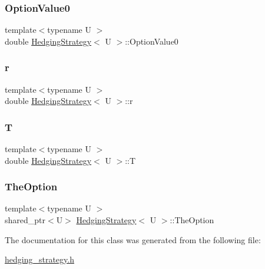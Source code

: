 \subsubsection{\texorpdfstring{Option\+Value0}{OptionValue0}}
{\footnotesize\ttfamily template$<$typename U $>$ \\
double \hyperlink{classHedgingStrategy}{Hedging\+Strategy}$<$ U $>$\+::Option\+Value0\hspace{0.3cm}{\ttfamily [protected]}}

\hypertarget{classHedgingStrategy_a313da7bc1911dba2a166d2c7bed5f1d7}{}\label{classHedgingStrategy_a313da7bc1911dba2a166d2c7bed5f1d7} 
\subsubsection{\texorpdfstring{r}{r}}
{\footnotesize\ttfamily template$<$typename U $>$ \\
double \hyperlink{classHedgingStrategy}{Hedging\+Strategy}$<$ U $>$\+::r\hspace{0.3cm}{\ttfamily [protected]}}

\hypertarget{classHedgingStrategy_aedb4069f0709b49482a72b9d9c906a5e}{}\label{classHedgingStrategy_aedb4069f0709b49482a72b9d9c906a5e} 
\subsubsection{\texorpdfstring{T}{T}}
{\footnotesize\ttfamily template$<$typename U $>$ \\
double \hyperlink{classHedgingStrategy}{Hedging\+Strategy}$<$ U $>$\+::T\hspace{0.3cm}{\ttfamily [protected]}}

\hypertarget{classHedgingStrategy_a65699a183423af9d947bb939ae8e907d}{}\label{classHedgingStrategy_a65699a183423af9d947bb939ae8e907d} 
\subsubsection{\texorpdfstring{The\+Option}{TheOption}}
{\footnotesize\ttfamily template$<$typename U $>$ \\
shared\+\_\+ptr$<$U$>$ \hyperlink{classHedgingStrategy}{Hedging\+Strategy}$<$ U $>$\+::The\+Option\hspace{0.3cm}{\ttfamily [protected]}}



The documentation for this class was generated from the following file\+:\begin{DoxyCompactItemize}
\item 
\hyperlink{hedging__strategy_8h}{hedging\+\_\+strategy.\+h}\end{DoxyCompactItemize}

